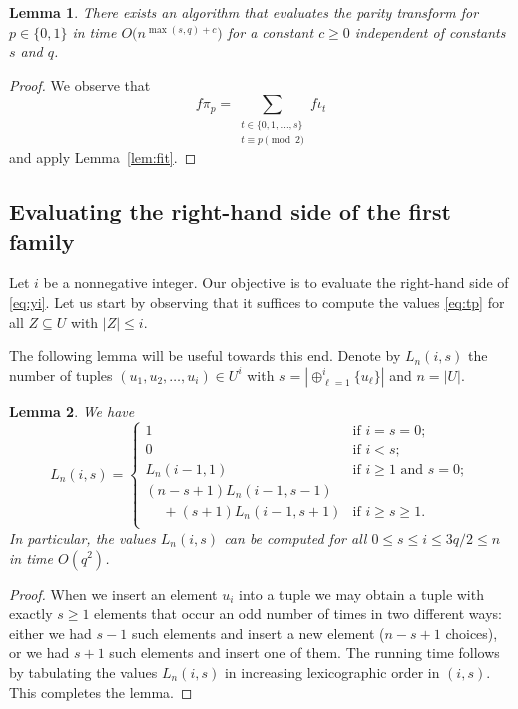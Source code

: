 \documentclass{amsart}
\newtheorem{Lem}{Lemma}
\begin{document}
\begin{Lem}
\label{lem:fpt}
There exists an algorithm that evaluates the parity transform
for $p\in\{0,1\}$ in time $O\bigl(n^{\max(s,q)+c}\bigr)$ for a 
constant $c\geq 0$ independent of constants $s$ and $q$. 
\end{Lem}
\begin{proof}
We observe that 
\[
f\pi_p=\sum_{\substack{t\in\{0,1,\ldots,s\}\\t\equiv p\!\!\!\pmod 2}}f\iota_t
\]
and apply Lemma~\ref{lem:fit}.
\end{proof}

\subsection{Evaluating the right-hand side of the first family}
Let $i$ be a nonnegative integer. Our objective is to evaluate 
the right-hand side of \eqref{eq:yi}.
Let us start by observing that it suffices to compute the values
\eqref{eq:tp} for all $Z\subseteq U$ with $|Z|\leq i$. 

The following lemma will be useful towards this end.
Denote by $L_n(i,s)$ the number of tuples $(u_1,u_2,\ldots,u_i)\in U^i$ with 
$s=|\oplus_{\ell=1}^i\{u_\ell\}|$ and $n=|U|$.

\begin{Lem}
\label{lem:lnis}
We have
\[
L_n(i,s)=\begin{cases}
1 & \text{if $i=s=0$};\\
0 & \text{if $i<s$};\\
L_n(i-1,1) & \text{if $i\geq 1$ and $s=0$};\\[2.5mm]
(n-s+1)L_n(i-1,s-1)& \\
\quad\ +(s+1)L_n(i-1,s+1) & \text{if $i\geq s\geq 1$}.\\
\end{cases}
\]
In particular, the values $L_n(i,s)$ can be computed for all
$0\leq s\leq i\leq 3q/2\leq n$ in time $O(q^2)$.
\end{Lem}
\begin{proof}
When we insert an element $u_i$ into a tuple we may obtain a tuple with exactly $s\geq 1$ elements that occur an odd number of times in two different ways: 
either we had $s-1$ such elements and insert a new element ($n-s+1$ choices), 
or we had $s+1$ such elements and insert one of them. 
The running time follows by tabulating the values $L_n(i,s)$ in increasing 
lexicographic order in $(i,s)$. This completes the lemma.
\end{proof}
\end{document}
